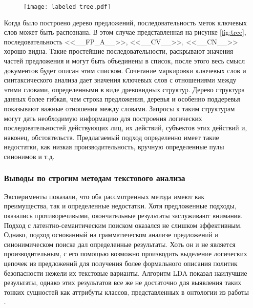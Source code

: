 \documentclass[../main]{subfiles}
\begin{document}
\begin{figure}[H]
    \centering
    {\texttt{[image: labeled\_tree.pdf]}}
    \vspace{-\baselineskip}
\end{figure}

Когда было построено дерево предложений, последовательность меток ключевых слов может быть распознана. В этом случае представленная на рисунке \ref{fig:tree}, последовательность <<\_\_FP\_A\_\_>>, <<\_\_CV\_\_>>, <<\_\_CN\_\_>> хорошо видна. Такие простейшие последовательности, раскрывают значения частей предложения и могут быть объединены в список, после этого весь смысл документов будет описан этим списком. Сочетание маркировки ключевых слов и синтаксического анализа дает значения ключевых слов с отношениями между этими словами, определенными в виде древовидных структур. Дерево структура данных более гибкая, чем строка предложения, деревья и особенно поддеревья показывают важные отношения между словами. Запросы к таким структурам могут дать необходимую информацию для построения логических последовательностей действующих лиц, их действий, субъектов этих действий и, наконец, обстоятельств. Предлагаемый подход определенно имеет такие недостатки, как низкая производительность, вручную определенные пулы синонимов и т.д.

\subsubsection{Выводы по строгим методам текстового анализа}

Эксперименты показали, что оба рассмотренных метода имеют как преимущества, так и определенные недостатки. Хотя предложенные подходы, оказались противоречивыми, окончательные результаты заслуживают внимания. Подход с латентно-семантическим поиском оказался не слишком эффективным. Однако, подход основанный на грамматическом анализе предложений и синонимическом поиске дал определенные результаты. Хоть он и не является производительным, с его помощью возможно производить выделение логических цепочек из предложений для получения более формального описания политик безопасности нежели их текстовые варианты. Алгоритм LDA показал наилучшие результаты, однако этих результатов все же не достаточно для выявления таких тонких сущностей как аттрибуты классов, представленных в онтологии из работы \cite{P2Onto}.
\end{document}
